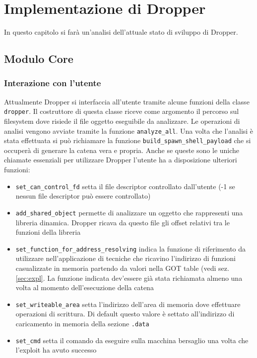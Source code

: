 \chapter{Implementazione di Dropper}
\label{cap:implementazione}

In questo capitolo si farà un'analisi dell'attuale stato di sviluppo
di Dropper.

\section{Modulo Core}

\subsection{Interazione con l'utente}

Attualmente Dropper si interfaccia all'utente tramite alcune funzioni
della classe \lstinline{dropper}. Il costruttore di questa classe
riceve come argomento il percorso sul filesystem dove risiede il file
oggetto eseguibile da analizzare. Le operazioni di analisi vengono
avviate tramite la funzione \lstinline{analyze_all}. Una volta che
l'analisi è stata effettuata si può richiamare la funzione
\lstinline{build_spawn_shell_payload} che si occuperà di generare la
catena vera e propria. Anche se queste sono le uniche chiamate
essenziali per utilizzare Dropper l'utente ha a disposizione ulteriori
funzioni:
\begin{itemize}

\item \lstinline{set_can_control_fd} setta il file descriptor
  controllato dall'utente (-1 se nessun file descriptor può essere
  controllato)

\item \lstinline{add_shared_object} permette di analizzare un oggetto
  che rappresenti una libreria dinamica. Dropper ricava da questo file
  gli offset relativi tra le funzioni della libreria

\item \lstinline{set_function_for_address_resolving} indica la
  funzione di riferimento da utilizzare nell'applicazione di tecniche
  che ricavino l'indirizzo di funzioni casualizzate in memoria
  partendo da valori nella GOT table (vedi sez. \ref{sec:expl}. La
  funzione indicata dev'essere già stata richiamata almeno una volta
  al momento dell'esecuzione della catena

\item \lstinline{set_writeable_area} setta l'indirizzo dell'area di
  memoria dove effettuare operazioni di scrittura. Di default questo
  valore è settato all'indirizzo di caricamento in memoria della
  sezione \lstinline{.data}

\item \lstinline{set_cmd} setta il comando da eseguire sulla macchina
  bersaglio una volta che l'exploit ha avuto successo

\end{itemize}

